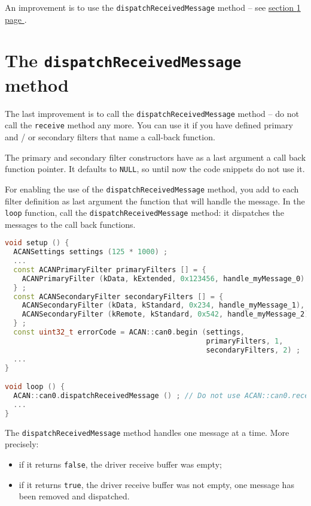 \documentclass[10pt, a4paper, obeyspaces, openany]{extarticle}
\newcommand \sectionLabel[2]{\section{#1}\label{sec:#2}}
\newcommand\refSectionPage[1]{\hyperref[sec:#1]{section \ref*{sec:#1} page \pageref{sec:#1}}}
\begin{document}
An improvement is to use the \texttt{dispatchReceivedMessage} method -- see \refSectionPage{UsingDispatchMethod}.














\sectionLabel{The \texttt{dispatchReceivedMessage} method}{UsingDispatchMethod}

The last improvement is to call the \texttt{dispatchReceivedMessage} method -- do not call the \texttt{receive} method any more. You can use it if you have defined primary and / or secondary filters that name a call-back function.

The primary and secondary filter constructors have as a last argument a call back function pointer. It defaults to \texttt{NULL}, so until now the code snippets do not  use it.

For enabling the use of the \texttt{dispatchReceivedMessage} method, you add to each filter definition as last argument the function that will handle the message. In the \texttt{loop} function, call the \texttt{dispatchReceivedMessage} method: it dispatches the messages to the call back functions.

{ \small\begin{lstlisting}[language=c++]
void setup () {
  ACANSettings settings (125 * 1000) ;
  ...
  const ACANPrimaryFilter primaryFilters [] = {
    ACANPrimaryFilter (kData, kExtended, 0x123456, handle_myMessage_0)
  } ;
  const ACANSecondaryFilter secondaryFilters [] = {
    ACANSecondaryFilter (kData, kStandard, 0x234, handle_myMessage_1),
    ACANSecondaryFilter (kRemote, kStandard, 0x542, handle_myMessage_2)
  } ;
  const uint32_t errorCode = ACAN::can0.begin (settings,
                                               primaryFilters, 1,
                                               secondaryFilters, 2) ;
  ...
}

void loop () {
  ACAN::can0.dispatchReceivedMessage () ; // Do not use ACAN::can0.receive any more
  ...
}
\end{lstlisting}}

The \texttt{dispatchReceivedMessage} method handles one message at a time. More precisely:
\begin{itemize}
  \item if it returns \texttt{false}, the driver receive buffer was empty;
  \item if it returns \texttt{true}, the driver receive buffer was not empty, one message has been removed and dispatched.
\end{itemize}
\end{document}
